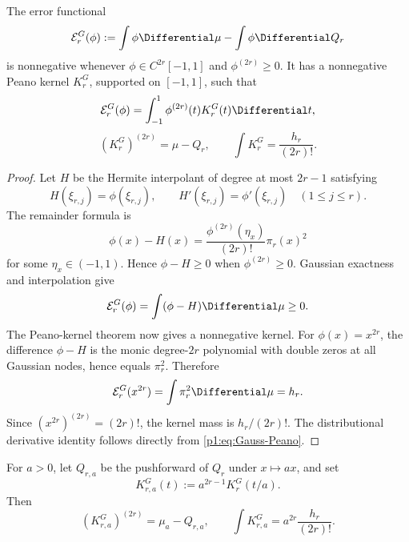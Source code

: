 \documentclass[11pt]{article}
\numberwithin{equation}{section}
\theoremstyle{definition}
\theoremstyle{remark}
\begin{document}
\begin{proposition}
\label{p1:prop:gauss-kernel}
The error functional
\begin{equation}
 \mathcal E_r^G(\phi):=\int\phi\Differential\mu-\int\phi\Differential Q_r
 \label{p1:eq:Gauss-functional}
\end{equation}
is nonnegative whenever $\phi\in C^{2r}[-1,1]$ and $\phi^{(2r)}\ge0$.  It has a nonnegative Peano kernel $K_r^G$, supported on $[-1,1]$, such that
\begin{equation}
 \mathcal E_r^G(\phi)=\int_{-1}^{1}\phi^{(2r)}(t)K_r^G(t)\Differential t,
 \label{p1:eq:Gauss-Peano}
\end{equation}
\begin{equation}
 (K_r^G)^{(2r)}=\mu-Q_r,
 \qquad
 \int K_r^G=\frac{h_r}{(2r)!}.
 \label{p1:eq:Gauss-kernel-mass}
\end{equation}
\end{proposition}

\begin{proof}
Let $H$ be the Hermite interpolant of degree at most $2r-1$ satisfying
\[
 H(\xi_{r,j})=\phi(\xi_{r,j}),
 \qquad
 H'(\xi_{r,j})=\phi'(\xi_{r,j})
 \quad(1\le j\le r).
\]
The remainder formula is
\begin{equation}
 \phi(x)-H(x)=\frac{\phi^{(2r)}(\eta_x)}{(2r)!}\pi_r(x)^2
 \label{p1:eq:Hermite-Gauss-remainder}
\end{equation}
for some $\eta_x\in(-1,1)$.  Hence $\phi-H\ge0$ when $\phi^{(2r)}\ge0$.  Gaussian exactness and interpolation give
\[
 \mathcal E_r^G(\phi)
 =\int(\phi-H)\Differential\mu\ge0.
\]
The Peano-kernel theorem now gives a nonnegative kernel.  For $\phi(x)=x^{2r}$, the difference $\phi-H$ is the monic degree-$2r$ polynomial with double zeros at all Gaussian nodes, hence equals $\pi_r^2$.  Therefore
\[
 \mathcal E_r^G(x^{2r})=\int\pi_r^2\Differential\mu=h_r.
\]
Since $(x^{2r})^{(2r)}=(2r)!$, the kernel mass is $h_r/(2r)!$.  The distributional derivative identity follows directly from \eqref{p1:eq:Gauss-Peano}.
\end{proof}

For $a>0$, let $Q_{r,a}$ be the pushforward of $Q_r$ under $x\mapsto ax$, and set
\begin{equation}
 K_{r,a}^G(t):=a^{2r-1}K_r^G(t/a).
 \label{p1:eq:scaled-G-kernel}
\end{equation}
Then
\begin{equation}
 (K_{r,a}^G)^{(2r)}=\mu_a-Q_{r,a},
 \qquad
 \int K_{r,a}^G=a^{2r}\frac{h_r}{(2r)!}.
 \label{p1:eq:scaled-G-properties}
\end{equation}
\end{document}
